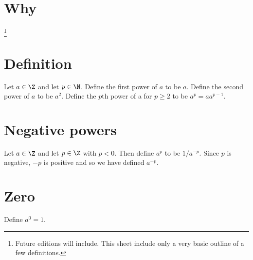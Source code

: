 
\section*{Why}
\footnote{Future editions will include. This sheet include only a very basic outline of a few definitions.}
\section*{Definition}

Let $a \in \Z $ and let $p \in \N  $.
Define the first power of $a$ to be $a$.
Define the second power of $a$ to be $a^2$.
Define the $p$th power of a for $p \geq 2$ to be $a^p = aa^{p-1}$.

\section*{Negative powers}

Let $a \in \Z $ and let $p \in \Z $ with $p < 0$.
Then define $a^{p}$ to be $1/a^{-p}$.
Since $p$ is negative, $-p$ is positive and so we have defined $a^{-p}$.

\section*{Zero}

Define $a^0 = 1$.

\blankpage